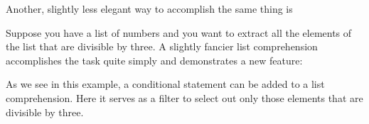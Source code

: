 \documentclass[letterpaper,10pt,english]{sphinxmanual}
\begin{document}
\sphinxAtStartPar
Another, slightly less elegant way to accomplish the same thing is

\begin{sphinxVerbatim}[commandchars=\\\{\}]
\PYG{p}{[}\PYG{p}{[}\PYG{p}{]}\PYG{p}{[}\PYG{p}{]}    \PYG{p}{]}
\PYG{p}{[}  \PYG{p}{]}
\end{sphinxVerbatim}

\sphinxAtStartPar
Suppose you have a list of numbers and you want to extract all the elements of the list that are divisible by three.  A slightly fancier list comprehension accomplishes the task quite simply and demonstrates a new feature:

\begin{sphinxVerbatim}[commandchars=\\\{\}]
   \PYG{p}{[}         \PYG{p}{]}
\PYG{p}{[}      \PYG{p}{]}
\PYG{p}{[}  \PYG{p}{]}
\end{sphinxVerbatim}

\sphinxAtStartPar
As we see in this example, a conditional statement can be added to a list comprehension.  Here it serves as a filter to select out only those elements that are divisible by three.

\newpage
\end{document}

